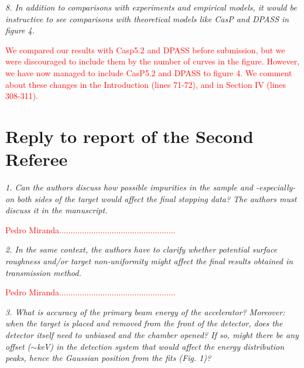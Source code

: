 \documentclass[a4paper,10pt]{article}
\def\reviewer#1{\vspace{0.35cm}\textsl{#1}}
\def\reply#1{\vspace{0.1cm}\textcolor{red}{#1}}
\begin{document}
\reviewer{8. In addition to comparisons with experiments and empirical 
models, it would be instructive to see comparisons with theoretical 
models like CasP and DPASS in figure 4.}

\reply{We compared our results with Casp5.2 and DPASS before submission,
but we were discouraged to include them by the number of curves in the
figure. However, we have now managed to include CasP5.2 and DPASS to
figure 4. We comment about these changes in the Introduction 
(lines 71-72), and in Section IV (lines 308-311).}

\newpage
\section{Reply to report of the Second Referee}
\reviewer{1. Can the authors discuss how possible impurities in the 
sample and -especially- on both sides of the target would affect the 
final stopping data? The authors must discuss it in the manuscript.}

\reply{Pedro Miranda...................................................}

\reviewer{2. In the same context, the authors have to clarify whether
potential surface roughness and/or target non-uniformity might affect 
the final results obtained in transmission method.}

\reply{Pedro Miranda...................................................}

\reviewer{3. What is accuracy of the primary beam energy of the 
accelerator? Moreover: when the target is placed and removed from the 
front of the detector, does the detector itself need to unbiased and the 
chamber opened? If so, might there be any offset ($\sim$keV) in the 
detection system that would affect the energy distribution peaks, hence 
the Gaussian position from the fits (Fig. 1)?}
\end{document}
